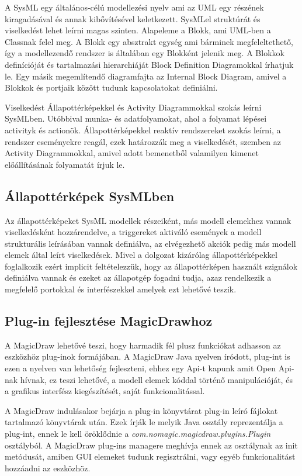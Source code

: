 A SysML egy általános-célú modellezési nyelv ami az UML egy részének kiragadásával és annak kibővítésével keletkezett. SysMLel struktúrát és viselkedést lehet leírni magas szinten. Alapeleme a Blokk, ami UML-ben a Classnak felel meg. A Blokk egy absztrakt egység ami bárminek megfeleltethető, így a modellezendő rendszer is általában egy Blokként jelenik meg. A Blokkok definícióját és tartalmazási hierarchiáját Block Definition Diagramokkal írhatjuk le. Egy másik megemlítendő diagramfajta az Internal Block Diagram, amivel a Blokkok és portjaik között tudunk kapcsolatokat definiálni.

Viselkedést Állapottérképekkel és Activity Diagrammokkal szokás leírni SysMLben. Utóbbival munka- és adatfolyamokat, ahol a folyamat lépései activityk és actionök. Állapottérképekkel reaktív rendszereket szokás leírni, a rendszer eseményekre reagál, ezek határozzák meg a viselkedését, szemben az Activity Diagrammokkal, amivel adott bemenetből valamilyen kimenet előállításának folyamatát írjuk le.

\subsection{Állapottérképek SysMLben}
Az állapottérképeket SysML modellek részeiként, más modell elemekhez vannak viselkedésként hozzárendelve, a triggereket aktiváló események a modell strukturális leírásában vannak definiálva, az elvégezhető akciók pedig más modell elemek által leírt viselkedések. Mivel a dolgozat kizárólag állapottérképekkel foglalkozik ezért implicit feltételezzük, hogy az állapottérképen használt szignálok definiálva vannak és ezeket az állapotgép fogadni tudja, azaz rendelkezik a megfelelő portokkal és interfészekkel amelyek ezt lehetővé teszik.

\subsection{Plug-in fejlesztése MagicDrawhoz}
A MagicDraw lehetővé teszi, hogy harmadik fél plusz funkciókat adhasson az eszközhöz plug-inok formájában. A MagicDraw Java nyelven íródott, plug-int is ezen a nyelven van lehetőség fejleszteni, ehhez egy Api-t kapunk amit Open Api-nak \cite{OpenApi} hívnak, ez teszi lehetővé, a modell elemek kóddal történő manipulációját, és a grafikus interfész kiegészítését, saját funkcionalitással.

A MagicDraw indulásakor bejárja a plug-in könyvtárat plug-in leíró fájlokat tartalmazó könyvtárak után. Ezek írják le melyik Java osztály reprezentálja a plug-int, ennek le kell öröklődnie a \emph{com.nomagic.magicdraw.plugins.Plugin} osztályból. A MagicDraw plug-ins managere meghívja ennek az osztálynak az init metódusát, amiben GUI elemeket tudunk regisztrálni, vagy egyéb funkcionalitást hozzáadni az eszközhöz.

